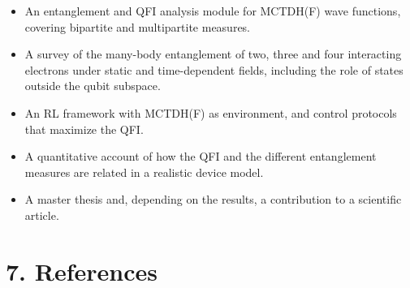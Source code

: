 \documentclass[12pt,a4paper]{article}
\begin{document}
\begin{itemize}
    \item An entanglement and QFI analysis module for MCTDH(F) wave
    functions, covering bipartite and multipartite measures.
    \item A survey of the many-body entanglement of two, three and
    four interacting electrons under static and time-dependent
    fields, including the role of states outside the qubit subspace.
    \item An RL framework with MCTDH(F) as environment, and control
    protocols that maximize the QFI.
    \item A quantitative account of how the QFI and the different
    entanglement measures are related in a realistic device model.
    \item A master thesis and, depending on the results, a
    contribution to a scientific article.
\end{itemize}

\section*{7. References}
\end{document}

